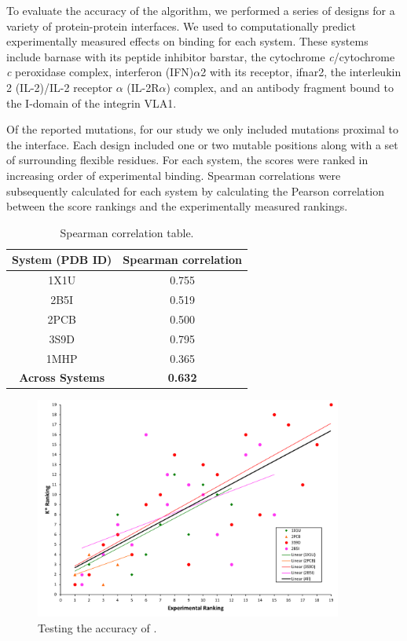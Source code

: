 To evaluate the accuracy of the \osprey \ks algorithm, we performed a series of designs for a variety of protein-protein interfaces. We used \ks to computationally predict experimentally measured effects on binding for each system. These systems include barnase with its peptide inhibitor barstar, the cytochrome {\it c}/cytochrome {\it c} peroxidase complex, interferon (IFN)$\alpha$2 with its receptor, ifnar2, the interleukin 2 (IL-2)/IL-2 receptor $\alpha$ (IL-2R$\alpha$) complex, and an antibody fragment bound to the I-domain of the integrin VLA1. 


Of the reported mutations, for our study we only included mutations proximal to the interface. Each design included one or two mutable positions along with a set of surrounding flexible residues. For each system, the \ks scores were ranked in increasing order of experimental binding. Spearman correlations were subsequently calculated for each system by calculating the Pearson correlation between the \ks score rankings and the experimentally measured rankings. 

\begin{table}[h!]
\centering
\begin{tabular}{ |c||c|  }
 \hline
 \textbf{System (PDB ID)}& \textbf{Spearman correlation} \\
 \hline 
 1X1U   & 0.755 \\
 \hline
 2B5I   & 0.519 \\
 \hline
 2PCB   & 0.500 \\
 \hline
 3S9D   & 0.795 \\
 \hline
 1MHP   & 0.365 \\
 \hline 
 \textbf{Across Systems} &   \textbf{0.632}  \\
 \hline
\end{tabular}
\caption{Spearman correlation table.}
\end{table}

\begin{figure}\label{fig:rankings}
\center
\includegraphics[width=0.9\textwidth]{figures/Rankings.png}
\caption{Testing the accuracy of .}
\end{figure}

